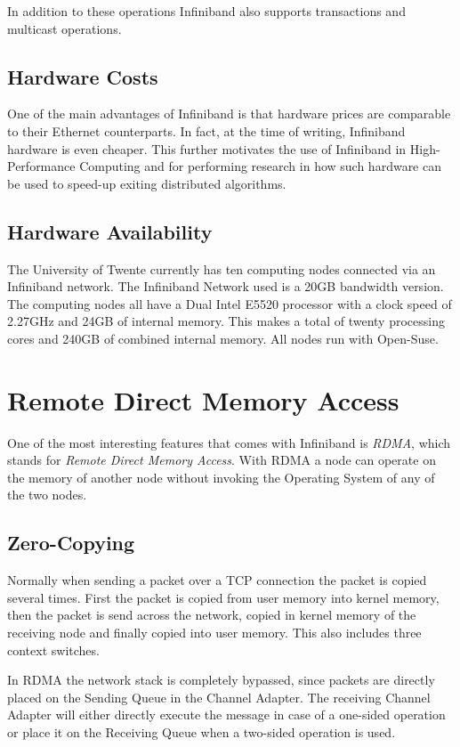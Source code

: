 In addition to these operations Infiniband also supports transactions and multicast operations. 

\subsection{Hardware Costs}
One of the main advantages of Infiniband is that hardware prices are comparable to their Ethernet counterparts. In fact, at the time of writing, Infiniband hardware is even cheaper. This further motivates the use of Infiniband in High-Performance Computing and for performing research in how such hardware can be used to speed-up exiting distributed algorithms.

\subsection{Hardware Availability}
The University of Twente currently has ten computing nodes connected via an Infiniband network. The Infiniband Network used is a 20GB bandwidth version. The computing nodes all have a Dual Intel E5520 processor with a clock speed of 2.27GHz and 24GB of internal memory. This makes a total of twenty processing cores and 240GB of combined internal memory. All nodes run with Open-Suse. 


\section{Remote Direct Memory Access}
One of the most interesting features that comes with Infiniband is \emph{RDMA}, which stands for \emph{Remote Direct Memory Access}. With RDMA a
node can operate on the memory of another node without invoking the Operating System of any of the two nodes. 

\subsection{Zero-Copying}
Normally when sending a packet over a TCP connection the packet is copied several times. First the packet is copied from user memory into kernel memory, then the packet is send across the network, copied in kernel memory of the receiving node and finally copied into user memory. This also includes three context switches.

In RDMA the network stack is completely bypassed, since packets are directly placed on the Sending Queue in the Channel Adapter. The receiving Channel Adapter will either directly execute the message in case of a one-sided operation or place it on the Receiving Queue when a two-sided operation is used. 

